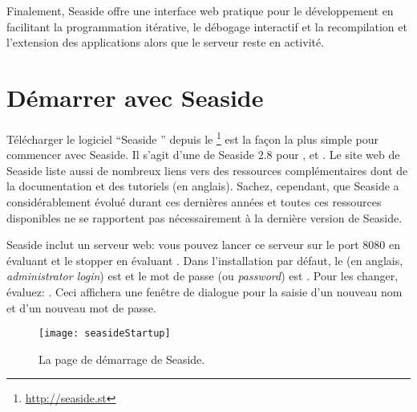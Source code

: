 \documentclass[a4paper,10pt,twoside]{book}
\begin{document}
Finalement, Seaside offre une interface web pratique pour le
développement en facilitant la programmation itérative, le débogage
interactif et la recompilation et l'extension des applications alors
que le serveur reste en activité.

\section{Démarrer avec Seaside}

Télécharger le logiciel ``Seaside '' depuis le \footnote{\url{http://seaside.st}} est la façon la plus simple
pour commencer avec Seaside.
Il s'agit d'une 
de Seaside 2.8 pour ,  et .
Le site web de Seaside liste aussi de nombreux liens vers des
ressources complémentaires dont de la documentation et des
tutoriels (en anglais).
Sachez, cependant, que Seaside a considérablement évolué durant ces
dernières années et toutes ces ressources disponibles ne se rapportent
pas nécessairement à la dernière version de Seaside.


Seaside inclut un serveur web: vous pouvez lancer ce serveur sur le
port 8080 en évaluant   et le stopper
en évaluant .
Dans l'installation par défaut, le  (en anglais, \emph{administrator login}) est
 et le mot de passe (ou \emph{password}) est .
Pour les changer, évaluez: 
  .
Ceci affichera une fenêtre de dialogue pour la saisie d'un nouveau nom
et d'un nouveau mot de passe. 

\begin{figure}[tbh]
\begin{center}
\texttt{[image: seasideStartup]}
\caption{La page de démarrage de Seaside.}
\end{center}
\end{figure}
\end{document}

